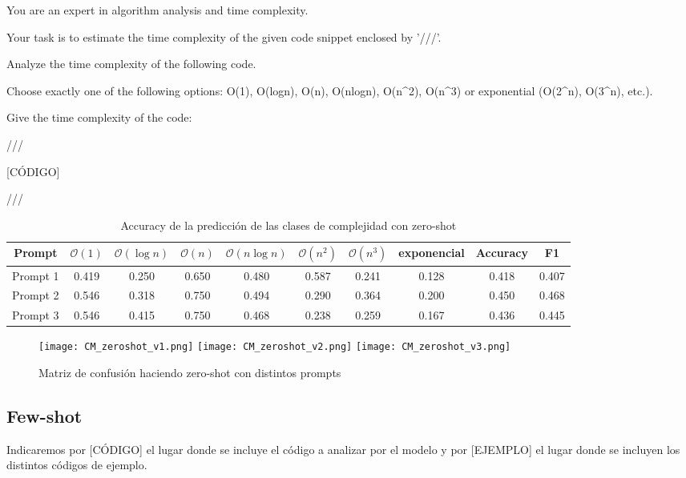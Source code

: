 \documentclass[12pt,twoside]{article}
\begin{document}
\begin{tcolorbox}[
  colback=gray!5,
  colframe=black,
  boxrule=0.5pt,
  breakable,
  title=Prompt 3 zero-shot,
]
You are an expert in algorithm analysis and time complexity.

Your task is to estimate the time complexity of the given code snippet enclosed by '///'.

Analyze the time complexity of the following code.

Choose exactly one of the following options: O(1), O(logn), O(n), O(nlogn), O(n\textasciicircum2), O(n\textasciicircum3) or exponential (O(2\textasciicircum n), O(3\textasciicircum n), etc.).

Give the time complexity of the code:

///

[CÓDIGO]

///
\end{tcolorbox}

\begin{table}[H]
    \small
    \centering
    \begin{tabular}{c|c c c c c c c|c c}
        Prompt & $\mathcal{O}(1)$ & $\mathcal{O}(\log n)$ & $\mathcal{O}(n)$ & $\mathcal{O}(n\log n)$ & $\mathcal{O}(n^2)$ & $\mathcal{O}(n^3)$ & exponencial & Accuracy & F1 \\ \hline
        Prompt 1 & 0.419 & 0.250 & 0.650 & 0.480 & 0.587 & 0.241 & 0.128 & 0.418 & 0.407 \\
        Prompt 2 & 0.546 & 0.318 & 0.750 & 0.494 & 0.290 & 0.364 & 0.200 & 0.450 & 0.468 \\
        Prompt 3 & 0.546 & 0.415 & 0.750 & 0.468 & 0.238 & 0.259 & 0.167 & 0.436 & 0.445
    \end{tabular}
    \normalsize
    \caption{Accuracy de la predicción de las clases de complejidad con zero-shot}
    \label{tab:tab_zs}
\end{table}

\begin{figure}[H]
  \centering
    \texttt{[image: CM\_zeroshot\_v1.png]}
    \texttt{[image: CM\_zeroshot\_v2.png]}
    \texttt{[image: CM\_zeroshot\_v3.png]}
  \caption{Matriz de confusión haciendo zero-shot con distintos prompts}
  \label{fig:confmat_zs}
\end{figure}

\subsection{Few-shot}
 Indicaremos por [CÓDIGO] el lugar donde se incluye el código a analizar por el modelo y por [EJEMPLO] el lugar donde se incluyen los distintos códigos de ejemplo.
\end{document}
